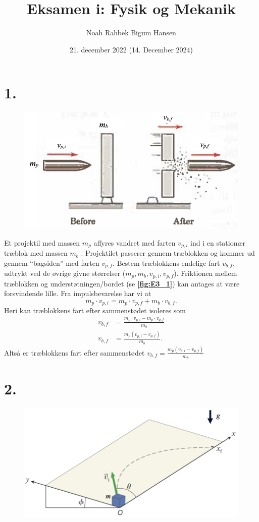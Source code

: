 \documentclass[12pt]{article}
\title{Eksamen i: Fysik og Mekanik}
\author{Noah Rahbek Bigum Hansen}
\date{21. december 2022 (14. December 2024)}
\theoremstyle{definition}
\begin{document}
\maketitle

\section*{1.}
\begin{figure} [ht]
  \centering
  \caption{}
  \includegraphics[width=0.5\linewidth]{../figures/E3_1.png}
  \label{fig:E3_1}
\end{figure}

Et projektil med massen $m_p$ affyres vandret med farten $v_{p,i}$ ind i en stationær træblok med massen $m_b$ .  Projektilet passerer gennem træblokken og kommer ud gennem ``bagsiden'' med farten $v_{p,f}$. Bestem træblokkens endelige fart $v_{b,f}$, udtrykt ved de øvrige givne størrelser ($m_p, m_b, v_{p,i}, v_{p,f}$). Friktionen mellem træblokken og understøtningen/bordet (se \textbf{\autoref{fig:E3_1}}) kan antages at være forsvindende lille.
\bigbreak
Fra impulsbevarelse har vi at
\[ 
m_p \cdot v_{p,i} = m_p \cdot v_{p,f} + m_b \cdot v_{b,f}
.\]
Heri kan træblokkens fart efter sammenstødet isoleres som
\begin{align*}
  v_{b,f} &= \frac{m_p \cdot v_{p,i} - m_p \cdot v_{p,f}}{m_b} \\
  v_{b,f} &= \frac{m_p \left( v_{p,i} - v_{p,f} \right)}{m_b}
.\end{align*}
Altså er træblokkens fart efter sammenstødet $v_{b,f} = \frac{m_p \left( v_{p,i} - v_{p,f} \right)}{m_b}$


\section*{2.}
\begin{figure} [ht]
  \centering
  \caption{}
  \includegraphics[width=0.5\linewidth]{../figures/E3_2.png}
  \label{fig:E3_2}
\end{figure}
\end{document}
